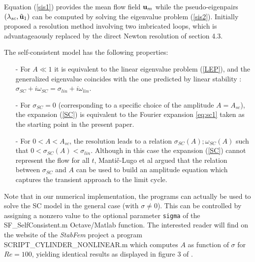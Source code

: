 \documentclass[twocolumn,10pt]{asme2ej}
\begin{document}
Equation (\ref{sis1}) provides the mean flow field ${\bf u }_m$ while the 
pseudo-eigenpairs $(\lambda_{sc},  \tilde{{\bf u }}_1)$ can be computed by solving the eigenvalue problem (\ref{sis2}).
\cite{MLugo2014} Initially proposed a resolution method involving two imbricated loops, which is advantageaously replaced by
the direct Newton resolution of section 4.3. 


The self-consistent model has the following properties:
\begin{itemize}
\item[-] For $ A \ll 1$ it is equivalent to the linear eigenvalue problem (\ref{LEP}), and the generalized eigenvalue coincides with the one predicted by linear stability : $\sigma_{SC} + i \omega_{SC} = \sigma_{lin} + i \omega_{lin}$.
\item[-] For $\sigma_{SC}=0$ (corresponding to a specific choice of the amplitude $A=A_{sc}$),  the expansion (\ref{SC}) is equivalent to 
the Fourier expansion \ref{eq:sc1} taken as the starting point in the present paper. 
\item[-] For $0<A<A_{sc}$, the resolution leads to a relation $\sigma_{SC}(A) ; \omega_{SC}(A)$
such that $0< \sigma_{SC}(A) < \sigma_{lin}$.
 Although in this case the expansion ({\ref{SC}}) cannot represent the flow for all $t$, Manti\v{c}-Lugo et al \cite{MLugo2014} argued that the relation between $\sigma_{SC}$ and $A$ can be used to build an amplitude equation which captures the transient approach to the limit cycle. 
\end{itemize}

Note that in our numerical implementation, the programs can actually be used to solve the SC model in the general case (with $\sigma\ne0$). 
This can be controlled by assigning a nonzero value to the optional parameter \verb|sigma| of the  {\sf SF\_SelfConsistent.m} Octave/Matlab function. The interested reader will find on the website of the {\em StabFem} project a program {\sf SCRIPT\_CYLINDER\_NONLINEAR.m} which computes $A$ as function of $\sigma$ for $Re=100$, yielding identical results as displayed in figure 3 of \cite{MLugo2014}.
\end{document}
